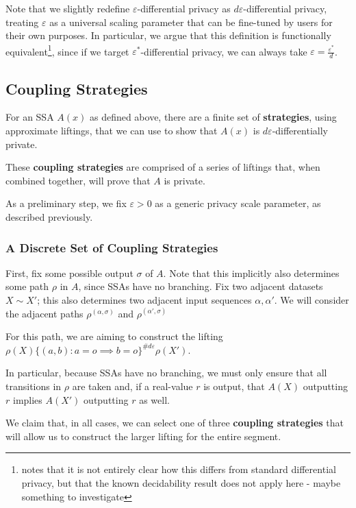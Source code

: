 \documentclass[12pt]{article}
\theoremstyle{definition}
\begin{document}
Note that we slightly redefine $\varepsilon$-differential privacy as $d\varepsilon$-differential privacy, treating $\varepsilon$ as a universal scaling parameter that can be fine-tuned by users for their own purposes. 
In particular, we argue that this definition is functionally equivalent\footnote{\cite{chadhaLinearTimeDecidability2021} notes that it is not entirely clear how this differs from standard differential privacy, but that the known decidability result does not apply here - {\color{red} maybe something to investigate}}, since if we target $\varepsilon^*$-differential privacy, we can always take $\varepsilon = \frac{\varepsilon^*}{d}$.

\subsection{Coupling Strategies}

For an SSA $A(x)$ as defined above, there are a finite set of \textbf{strategies}, using approximate liftings, that we can use to show that $A(x)$ is $d\varepsilon$-differentially private. 


These \textbf{coupling strategies} are comprised of a series of liftings that, when combined together, will prove that $A$ is private. 

As a preliminary step, we fix $\varepsilon>0$ as a generic privacy scale parameter, as described previously. 

\subsubsection{A Discrete Set of Coupling Strategies}

First, fix some possible output $\sigma$ of $A$. Note that this implicitly also determines some path $\rho$ in $A$, since SSAs have no branching. Fix two adjacent datasets $X\sim X'$; this also determines two adjacent input sequences $\alpha, \alpha'$. We will consider the adjacent paths $\rho^{(\alpha, \sigma)}$ and $\rho^{(\alpha', \sigma)}$

For this path, we are aiming to construct the lifting $\rho(X)\{(a, b): a=o \implies b=o\}^{\#d\varepsilon}\rho(X')$. 

In particular, because SSAs have no branching, we must only ensure that all transitions in $\rho$ are taken and, if a real-value $r$ is output, that $A(X)$ outputting $r$ implies $A(X')$ outputting $r$ as well. 

We claim that, in all cases, we can select one of three \textbf{coupling strategies} that will allow us to construct the larger lifting for the entire segment. 
\end{document}

